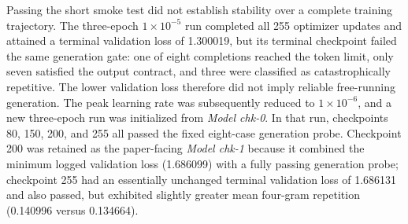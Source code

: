 Passing the short smoke test did not establish stability over a complete
training trajectory. The three-epoch \(1\times10^{-5}\) run completed all 255
optimizer updates and attained a terminal validation loss of 1.300019, but its
terminal checkpoint failed the same generation gate: one of eight completions
reached the token limit, only seven satisfied the output contract, and three
were classified as catastrophically repetitive. The lower validation loss
therefore did not imply reliable free-running generation. The peak learning
rate was subsequently reduced to \(1\times10^{-6}\), and a new three-epoch run
was initialized from \textit{Model chk-0}. In that run, checkpoints 80, 150,
200, and 255 all passed the fixed eight-case generation probe. Checkpoint 200
was retained as the paper-facing \textit{Model chk-1} because it combined the
minimum logged validation loss (1.686099) with a fully passing generation
probe; checkpoint 255 had an essentially unchanged terminal validation loss
of 1.686131 and also passed, but exhibited slightly greater mean four-gram
repetition (0.140996 versus 0.134664).

